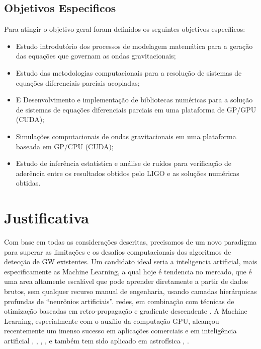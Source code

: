 \subsection{Objetivos Especificos}
Para atingir o objetivo geral foram definidos os seguintes objetivos específicos: 
\begin{itemize}

\item Estudo introdutório dos processos de modelagem matemática para a geração das equações que governam as ondas gravitacionais;
\item Estudo das metodologias computacionais para a resolução de sistemas de equações diferenciais parciais acopladas;
\item E Desenvolvimento e implementação de bibliotecas numéricas para a solução de sistemas de equações diferenciais parciais em uma plataforma de GP/GPU (CUDA);
\item Simulações computacionais de ondas gravitacionais em uma plataforma baseada em GP/CPU (CUDA);
\item Estudo de inferência estatística e análise de ruídos para verificação de aderência entre os resultados obtidos pelo LIGO e as soluções numéricas obtidas.

\end{itemize}
\section{Justificativa}

Com base em todas as considerações descritas, precisamos de um novo paradigma para superar as limitações e os desafios computacionais dos algoritmos de detecção de GW existentes. Um candidato ideal seria a inteligencia artificial, mais especificamente as Machine Learning, a qual hoje é tendencia no mercado, que é uma area  altamente escalável que pode aprender diretamente a partir de dados brutos, sem qualquer recurso manual de engenharia, usando camadas hierárquicas profundas de “neurônios artificiais”. redes, em combinação com técnicas de otimização baseadas em retro-propagação e gradiente descendente \cite{barca2005treinamento}. A Machine Learning, especialmente com o auxílio da computação GPU, alcançou recentemente um imenso sucesso em aplicações comerciais e em inteligência artificial \cite{esteva2017dermatologist}, \cite{moravvcik2017deepstack}, \cite{van2016wavenet}, \cite{10.1007/978-3-319-44188-7_16}, e também tem sido aplicado em astrofísica \cite{george2017glitch}, \cite{george2017deepA}.